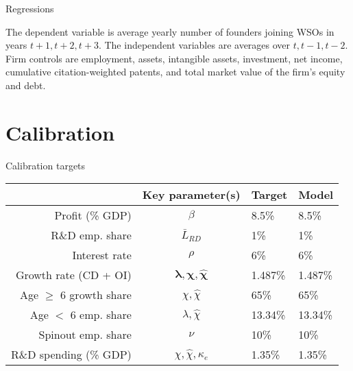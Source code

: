 \documentclass[english,usenames,dvipsnames,handout]{beamer}
\begin{document}
\begin{frame}{Regressions}
\begin{table}
\tiny
\centering

\caption{\scriptsize The dependent variable is average yearly number of founders joining WSOs in years $t+1,t+2,t+3$. The independent variables are averages over $t,t-1,t-2$. Firm controls are employment, assets, intangible assets, investment, net income, cumulative citation-weighted patents, and total market value of the firm's equity and debt.}
\end{table}
\end{frame}


\section{Calibration}


\begin{frame}
\tableofcontents[currentsection]
\end{frame}

\begin{frame}{Calibration targets}\label{calibration_targets}
\begin{table}[]
	\centering
	\label{calibration_targets}
	\small
	\begin{tabular}{rcll}
		\toprule \toprule
		& Key parameter(s) & Target & Model \tabularnewline
		\midrule
		Profit (\% GDP) & $\beta$ & 8.5\% & 8.5\% 
		\tabularnewline
		R\&D emp. share & $\bar{L}_{RD}$ & 1\% & 1\% 
		\tabularnewline
		Interest rate & $\rho$ & 6\% & 6\% 
		\tabularnewline
		Growth rate (CD + OI) & $\mathbf{\lambda, \chi, \hat{\chi}}$ & 1.487\% & 1.487\%
		\tabularnewline		
		Age $\ge$ 6 growth share & $\chi, \hat{\chi}$  & 65\% & 65\%
		\tabularnewline
		Age $<$ 6 emp. share  & $\lambda, \hat{\chi}$ & 13.34\% & 13.34\%
		\tabularnewline
		Spinout emp. share &$\nu$  & 10\% & 10\%
		\tabularnewline
		R\&D spending (\% GDP) & $\chi, \hat{\chi}, \kappa_e$  & 1.35\% & 1.35\%
		\tabularnewline
		\bottomrule
	\end{tabular}
\end{table}
	\hyperlink{economic_magnitude}{} 
\end{frame}
\end{document}
